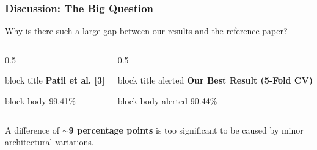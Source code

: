 \documentclass{beamer}
\begin{document}
\begin{frame}
    \frametitle{Discussion: The Big Question}
    Why is there such a large gap between our results and the reference paper?

    \begin{columns}
        \begin{column}{0.5\textwidth}
            \begin{beamercolorbox}[sep=1em,center]{block title}
                \textbf{Patil et al. [3]}
            \end{beamercolorbox}
            \begin{beamercolorbox}[sep=1em,center]{block body}
                \Huge{99.41\%}
            \end{beamercolorbox}
        \end{column}
        \begin{column}{0.5\textwidth}
            \begin{beamercolorbox}[sep=1em,center]{block title alerted}
                \textbf{Our Best Result (5-Fold CV)}
            \end{beamercolorbox}
            \begin{beamercolorbox}[sep=1em,center,wd=\textwidth]{block body alerted}
                \Huge{90.44\%}
            \end{beamercolorbox}
        \end{column}
    \end{columns}
    
    A difference of \textbf{$\sim$9 percentage points} is too significant to be caused by minor architectural variations.
\end{frame}
\end{document}
